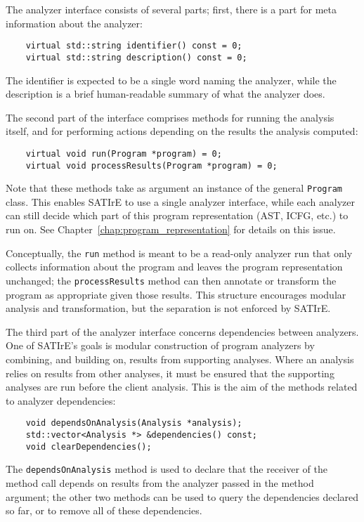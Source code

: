 \documentclass[a4paper,12pt]{report}
\begin{document}
The analyzer interface consists of several parts; first, there is a part for
meta information about the analyzer:
\begin{verbatim}
    virtual std::string identifier() const = 0;
    virtual std::string description() const = 0;
\end{verbatim}
The identifier is expected to be a single word naming the analyzer, while
the description is a brief human-readable summary of what the analyzer does.

The second part of the interface comprises methods for running the analysis
itself, and for performing actions depending on the results the analysis
computed:
\begin{verbatim}
    virtual void run(Program *program) = 0;
    virtual void processResults(Program *program) = 0;
\end{verbatim}
Note that these methods take as argument an instance of the general
\texttt{Program} class. This enables SATIrE to use a single analyzer
interface, while each analyzer can still decide which part of this program
representation (AST, ICFG, etc.) to run on. See
Chapter~\ref{chap:program_representation} for details on this issue.

Conceptually, the \texttt{run} method is meant to be a read-only analyzer
run that only collects information about the program and leaves the program
representation unchanged; the \texttt{processResults} method can then
annotate or transform the program as appropriate given those results. This
structure encourages modular analysis and transformation, but the separation
is not enforced by SATIrE.

The third part of the analyzer interface concerns dependencies between
analyzers. One of SATIrE's goals is modular construction of program
analyzers by combining, and building on, results from supporting analyses.
Where an analysis relies on results from other analyses, it must be ensured
that the supporting analyses are run before the client analysis. This is the
aim of the methods related to analyzer dependencies:
\begin{verbatim}
    void dependsOnAnalysis(Analysis *analysis);
    std::vector<Analysis *> &dependencies() const;
    void clearDependencies();
\end{verbatim}
The \texttt{dependsOnAnalysis} method is used to declare that the receiver
of the method call depends on results from the analyzer passed in the method
argument; the other two methods can be used to query the dependencies
declared so far, or to remove all of these dependencies.
\end{document}

